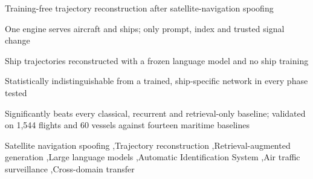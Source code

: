 \documentclass[preprint,12pt,authoryear]{elsarticle}
\begin{document}
\begin{frontmatter}
\begin{highlights}
\item Training-free trajectory reconstruction after satellite-navigation spoofing
\item One engine serves aircraft and ships; only prompt, index and trusted signal change
\item Ship trajectories reconstructed with a frozen language model and no ship training
\item Statistically indistinguishable from a trained, ship-specific network in every phase tested
\item Significantly beats every classical, recurrent and retrieval-only baseline; validated on 1,544 flights and 60 vessels against fourteen maritime baselines
\end{highlights}

\begin{keyword}
Satellite navigation spoofing \sep Trajectory reconstruction \sep Retrieval-augmented generation \sep Large language models \sep Automatic Identification System \sep Air traffic surveillance \sep Cross-domain transfer
\end{keyword}

\end{frontmatter}













\appendix

\end{document}
